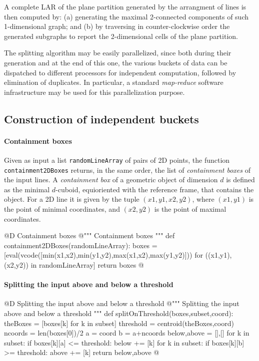 \documentclass[11pt,oneside]{article}    %
\begin{document}
A complete LAR of the plane partition generated by the arrangment of lines is then computed by: (a) generating the maximal 2-connected components of such 1-dimensional graph; and (b) by traversing in counter-clockwise order the generated subgraphs to report the 2-dimensional cells of the plane partition.

The splitting algorithm may be easily parallelized, since both during their generation and at the end of this one, the various buckets of data can be dispatched to different processors for independent computation, followed by elimination of duplicates. In particular, a standard \emph{map-reduce} software infrastructure may be used for this parallelization purpose.


\subsection{Construction of independent buckets}


\paragraph{Containment boxes}

Given as input a list \texttt{randomLineArray} of pairs of 2D points, the function \texttt{containment2DBoxes} returns, in the same order, the list of \emph{containment boxes} of the input lines. A \emph{containment box} of a geometric object of dimension $d$ is defined as the minimal $d$-cuboid, equioriented with the reference frame, that contains the object. For a 2D line it is given by the tuple $(x1,y1,x2,y2)$, where $(x1,y1)$ is the point of minimal coordinates, and $(x2,y2)$ is the point of maximal  coordinates.

@D Containment boxes
@{""" Containment boxes """
def containment2DBoxes(randomLineArray):
    boxes = [eval(vcode([min(x1,x2),min(y1,y2),max(x1,x2),max(y1,y2)]))
            for ((x1,y1),(x2,y2)) in randomLineArray]
    return boxes
@}



\paragraph{Splitting the input above and below a threshold}
@D Splitting the input above and below a threshold
@{""" Splitting the input above and below a threshold """
def splitOnThreshold(boxes,subset,coord):
    theBoxes = [boxes[k] for k in subset]
    threshold = centroid(theBoxes,coord)
    ncoords = len(boxes[0])/2
    a = coord%
    b = a+ncoords
    below,above = [],[]
    for k in subset:
        if boxes[k][a] <= threshold: below += [k]
    for k in subset:
        if boxes[k][b] >= threshold: above += [k]
    return below,above
@}
\end{document}

